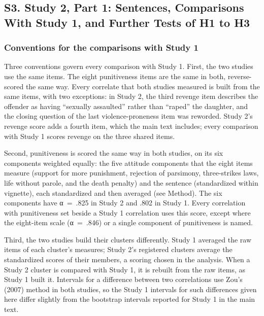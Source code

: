 \subsection{S3. Study 2, Part 1: Sentences, Comparisons With Study 1, and Further Tests of H1 to H3}\label{s3.-study-2-part-1-sentences-comparisons-with-study-1-and-further-tests-of-h1-to-h3}

\subsubsection{Conventions for the comparisons with Study 1}\label{conventions-for-the-comparisons-with-study-1}

Three conventions govern every comparison with Study 1. First, the two studies use the same items. The eight punitiveness items are the same in both, reverse-scored the same way. Every correlate that both studies measured is built from the same items, with two exceptions: in Study 2, the third revenge item describes the offender as having ``sexually assaulted'' rather than ``raped'' the daughter, and the closing question of the last violence-proneness item was reworded. Study 2's revenge score adds a fourth item, which the main text includes; every comparison with Study 1 scores revenge on the three shared items.

Second, punitiveness is scored the same way in both studies, on its six components weighted equally: the five attitude components that the eight items measure (support for more punishment, rejection of parsimony, three-strikes laws, life without parole, and the death penalty) and the sentence (standardized within vignette), each standardized and then averaged (see Method). The six components have α~=~.825 in Study 2 and .802 in Study 1. Every correlation with punitiveness set beside a Study 1 correlation uses this score, except where the eight-item scale (α~=~.846) or a single component of punitiveness is named.

Third, the two studies build their clusters differently. Study 1 averaged the raw items of each cluster's measures; Study 2's registered clusters average the standardized scores of their members, a scoring chosen in the analysis. When a Study 2 cluster is compared with Study 1, it is rebuilt from the raw items, as Study 1 built it. Intervals for a difference between two correlations use Zou's (2007) method in both studies, so the Study 1 intervals for such differences given here differ slightly from the bootstrap intervals reported for Study 1 in the main text.

